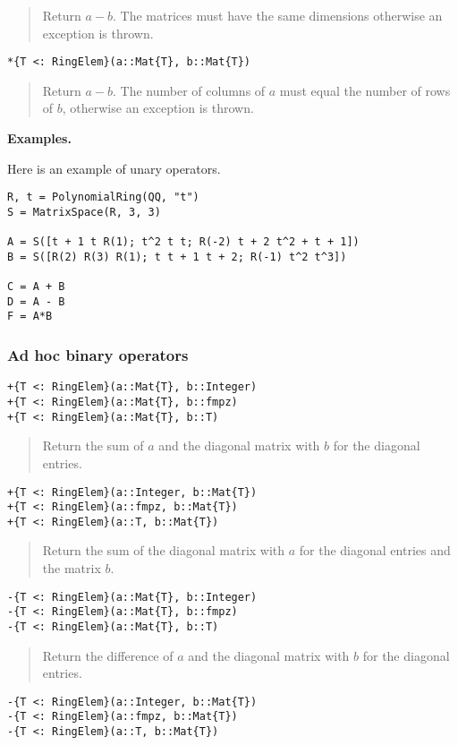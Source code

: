 \documentclass[a4paper,10pt]{article}
\newcommand{\desc}[1]{\vspace{-3mm}\begin{quote}#1\end{quote}}
\begin{document}
\desc{Return $a - b$. The matrices must have the same dimensions otherwise
an exception is thrown.}

\begin{lstlisting}
*{T <: RingElem}(a::Mat{T}, b::Mat{T})
\end{lstlisting}

\desc{Return $a - b$. The number of columns of $a$ must equal the number of
rows of $b$, otherwise an exception is thrown.}

\textbf{Examples.}

Here is an example of unary operators.

\begin{lstlisting}
R, t = PolynomialRing(QQ, "t")
S = MatrixSpace(R, 3, 3)

A = S([t + 1 t R(1); t^2 t t; R(-2) t + 2 t^2 + t + 1])
B = S([R(2) R(3) R(1); t t + 1 t + 2; R(-1) t^2 t^3])

C = A + B
D = A - B
F = A*B
\end{lstlisting}

\subsubsection{Ad hoc binary operators}

\begin{lstlisting}
+{T <: RingElem}(a::Mat{T}, b::Integer)
+{T <: RingElem}(a::Mat{T}, b::fmpz)
+{T <: RingElem}(a::Mat{T}, b::T)
\end{lstlisting}

\desc{Return the sum of $a$ and the diagonal matrix with $b$ for the diagonal
entries.}

\begin{lstlisting}
+{T <: RingElem}(a::Integer, b::Mat{T})
+{T <: RingElem}(a::fmpz, b::Mat{T})
+{T <: RingElem}(a::T, b::Mat{T})
\end{lstlisting}

\desc{Return the sum of the diagonal matrix with $a$ for the diagonal
entries and the matrix $b$.}

\begin{lstlisting}
-{T <: RingElem}(a::Mat{T}, b::Integer)
-{T <: RingElem}(a::Mat{T}, b::fmpz)
-{T <: RingElem}(a::Mat{T}, b::T)
\end{lstlisting}

\desc{Return the difference of $a$ and the diagonal matrix with $b$ for the diagonal
entries.}

\begin{lstlisting}
-{T <: RingElem}(a::Integer, b::Mat{T})
-{T <: RingElem}(a::fmpz, b::Mat{T})
-{T <: RingElem}(a::T, b::Mat{T})
\end{lstlisting}
\end{document}
